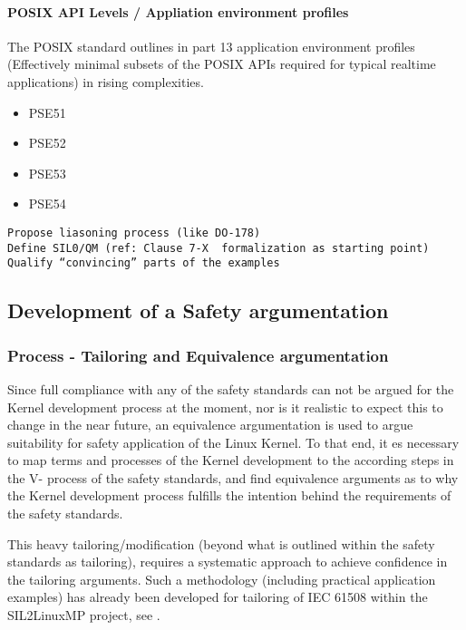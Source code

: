 \documentclass[12pt]{ElisaPaper}
\begin{document}
\paragraph{POSIX API Levels / Appliation environment profiles}
The POSIX standard  \cite{IEEE1003.1:2010} outlines in part 13 \cite{IEEE1003.13:2003} application environment profiles (Effectively minimal subsets of the POSIX APIs required for typical realtime applications) in rising complexities.
\begin{itemize}
\item PSE51
\item PSE52
\item PSE53
\item PSE54
\end{itemize}

\begin{verbatim}
Propose liasoning process (like DO-178)
Define SIL0/QM (ref: Clause 7-X  formalization as starting point)
Qualify “convincing” parts of the examples  
\end{verbatim}

\subsection{Development of a Safety argumentation}
\subsubsection{Process - Tailoring and Equivalence argumentation}
Since full compliance with any of the safety standards can not be argued for the Kernel development process at the moment, nor is it realistic to expect this to change in the near future, an equivalence argumentation is used to argue suitability for safety application of the Linux Kernel.
To that end, it es necessary to map terms and processes of the Kernel development to the according steps in the V- process of the safety standards, and find equivalence arguments as to why the Kernel development process fulfills the intention behind the requirements of the safety standards. 

This heavy tailoring/modification (beyond what is outlined within the safety standards as tailoring), requires a systematic approach to achieve confidence in the tailoring arguments.
Such a methodology (including practical application examples) has already been developed for tailoring of IEC 61508 within the SIL2LinuxMP project, see \cite{AnnexQR}.
\end{document}
